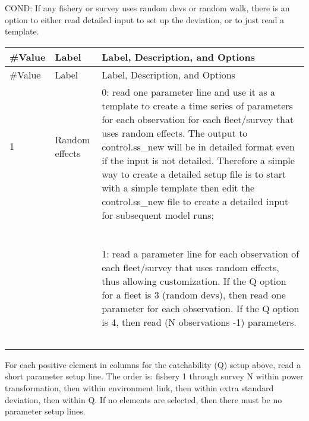 \noindent COND: If any fishery or survey uses random devs or random walk, there is an option to either read detailed input to set up the deviation, or to just read a template.

\begin{center}
	\begin{longtable}{p{2.75cm} p{2.75cm} p{2.75cm} p{2cm} p{2cm} p{2cm}}
		\endfirsthead

		\hline
		\#Value & Label & \multicolumn{4}{l}{Label, Description, and Options} \\
		\hline
		\endhead

		\endfoot
		\endlastfoot

		\hline
		\#Value & Label & \multicolumn{4}{l}{Label, Description, and Options} \\
		\hline
		1 & Random effects & \multicolumn{4}{l}{\multirow{2}{10cm}{0:  read one parameter line and use it as a template to create a time series of parameters for each observation for each fleet/survey that uses random effects.  The output to control.ss\_new will be in detailed format even if the input is not detailed.  Therefore a simple way to create a detailed setup file is to start with a simple template then edit the control.ss\_new file to create a detailed input for subsequent model runs;}}\\
		\\
		\\
		\\
		\\
		\\
		\\
		\\
		&  & \multicolumn{4}{l}{\multirow{2}{8cm}{1:  read a parameter line for each observation of each fleet/survey that uses random effects, thus allowing customization.  If the Q option for a fleet is 3 (random devs), then read one parameter for each observation.  If the Q option is 4, then read (N observations -1) parameters.}}\\
		\\
		\\
		\\
		\\
		\\
		\\
		\hline
	\end{longtable}
\end{center}


\noindent For each positive element in columns for the catchability (Q) setup above, read a short parameter setup line.  The order is: fishery 1 through survey N within power transformation, then within environment link, then within extra standard deviation, then within Q.  If no elements are selected, then there must be no parameter setup lines.

